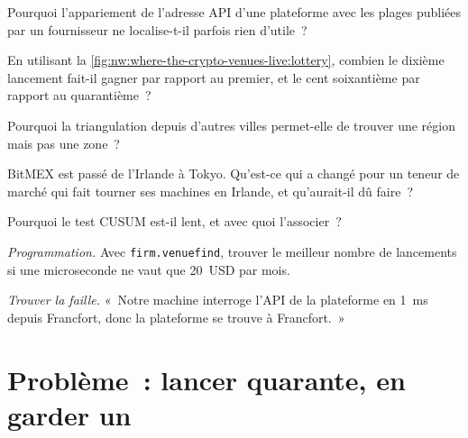 \begin{exercise}[$\star$]\label{exo:nw:where-the-crypto-venues-live:2}
Pourquoi l'appariement de l'adresse API d'une plateforme avec les plages publiées par un fournisseur ne localise-t-il parfois rien d'utile~?
\end{exercise}

\begin{exercise}[$\star$]\label{exo:nw:where-the-crypto-venues-live:3}
En utilisant la \cref{fig:nw:where-the-crypto-venues-live:lottery}, combien le dixième lancement fait-il gagner par rapport au premier, et le
cent soixantième par rapport au quarantième~?
\end{exercise}

\begin{exercise}[$\star\star$]\label{exo:nw:where-the-crypto-venues-live:4}
Pourquoi la triangulation depuis d'autres villes permet-elle de trouver une région mais pas une zone~?
\end{exercise}

\begin{exercise}[$\star\star$]\label{exo:nw:where-the-crypto-venues-live:5}
BitMEX est passé de l'Irlande à Tokyo. Qu'est-ce qui a changé pour un teneur de marché qui fait tourner ses machines en Irlande, et qu'aurait-il dû faire~?
\end{exercise}

\begin{exercise}[$\star\star$]\label{exo:nw:where-the-crypto-venues-live:6}
Pourquoi le test CUSUM est-il lent, et avec quoi l'associer~?
\end{exercise}

\begin{exercise}[$\star\star\star$]\label{exo:nw:where-the-crypto-venues-live:7}
\emph{Programmation.} Avec \texttt{firm.venuefind}, trouver le meilleur nombre de lancements si une microseconde ne vaut que 20~USD par mois.
\end{exercise}

\begin{exercise}[$\star\star\star$]\label{exo:nw:where-the-crypto-venues-live:8}
\emph{Trouver la faille.} «~Notre machine interroge l'API de la plateforme en \qty{1}{\milli\second} depuis Francfort, donc la plateforme se trouve à Francfort.~»
\end{exercise}

\section{Problème~: lancer quarante, en garder un}


